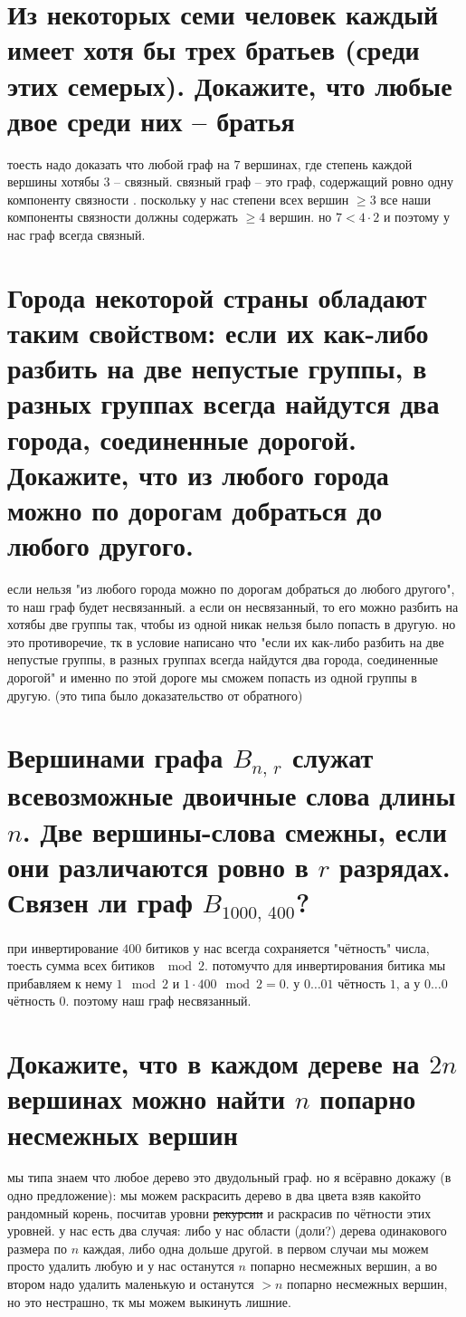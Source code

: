\documentclass{article}
\begin{document}
  \section{Из некоторых семи человек каждый имеет хотя бы трех братьев (среди этих семерых). Докажите, что любые двое среди них -- братья}
  тоесть надо доказать что любой граф на $7$ вершинах, где степень каждой вершины хотябы $3$ -- связный.
  связный граф -- это граф, содержащий ровно одну компоненту связности \cite{link}.
  поскольку у нас степени всех вершин $\ge 3$ все наши компоненты связности должны содержать $\ge 4$ вершин.
  но $7 < 4 \cdot 2$ и поэтому у нас граф всегда связный.

  \section{Города некоторой страны обладают таким свойством: если их как-либо разбить на две непустые группы, в разных группах всегда найдутся два города, соединенные дорогой. Докажите, что из любого города можно по дорогам добраться до любого другого.}
  если нельзя "{}из любого города можно по дорогам добраться до любого другого"{}, то наш граф будет несвязанный.
  а если он несвязанный, то его можно разбить на хотябы две группы так, чтобы из одной никак нельзя было попасть в другую.
  но это противоречие, тк в условие написано что
  "{}если их как-либо разбить на две непустые группы, в разных группах всегда найдутся два города, соединенные дорогой"{}
  и именно по этой дороге мы сможем попасть из одной группы в другую.
  (это типа было доказательство от обратного)

  \section{Вершинами графа $B_{n,\, r}$ служат всевозможные двоичные слова длины $n$. Две вершины-слова смежны, если они различаются ровно в $r$ разрядах. Связен ли граф $B_{1000,\, 400}$?}
  при инвертирование $400$ битиков у нас всегда сохраняется "{}чётность"{} числа, тоесть сумма всех битиков $\mod 2$.
  потомучто для инвертирования битика мы прибавляем к нему $1 \mod 2$ и $1 \cdot 400 \mod 2 = 0$.
  у $0 \dots 01$ чётность $1$, а у $0 \dots 0$ чётность $0$.
  поэтому наш граф несвязанный.

  \section{Докажите, что в каждом дереве на $2n$ вершинах можно найти $n$ попарно несмежных вершин}
  мы типа знаем что любое дерево это двудольный граф.
  но я всёравно докажу (в одно предложение): мы можем раскрасить дерево в два цвета взяв какойто рандомный корень,
  посчитав уровни \st{рекурсии} и раскрасив по чётности этих уровней.
  у нас есть два случая: либо у нас области (доли?) дерева одинакового размера по $n$ каждая, либо одна дольше другой.
  в первом случаи мы можем просто удалить любую и у нас останутся $n$ попарно несмежных вершин,
  а во втором надо удалить маленькую и останутся $>n$ попарно несмежных вершин, но это нестрашно, тк мы можем выкинуть лишние.
\end{document}
